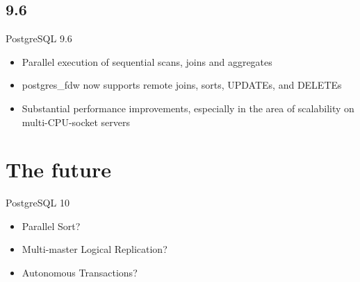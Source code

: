 \documentclass[t,10pt]{beamer}
\begin{document}
\subsection{9.6}
\begin{frame}{PostgreSQL 9.6}
  \begin{itemize}%
  \item Parallel execution of sequential scans, joins and aggregates
  \item postgres\_fdw now supports remote joins, sorts, UPDATEs, and DELETEs
  \item Substantial performance improvements, especially in the area of scalability on multi-CPU-socket servers
  \end{itemize}
\end{frame}

\section{The future}
\begin{frame}{PostgreSQL 10}
  \begin{itemize}%
  \item Parallel Sort?
  \item Multi-master Logical Replication?
  \item Autonomous Transactions?
  \end{itemize}
\end{frame}
\end{document}
